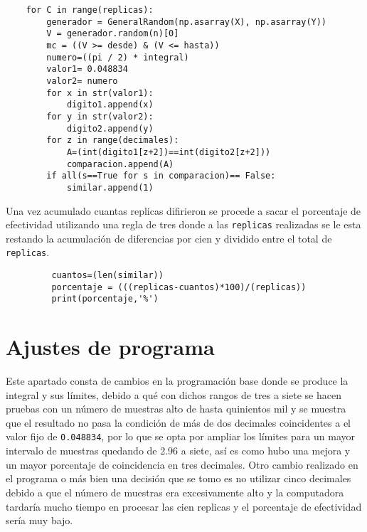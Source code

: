 \documentclass[a4paper, 11pt]{article}
\begin{document}
\begin{verbatim}
    for C in range(replicas):
        generador = GeneralRandom(np.asarray(X), np.asarray(Y))
        V = generador.random(n)[0]
        mc = ((V >= desde) & (V <= hasta))
        numero=((pi / 2) * integral)
        valor1= 0.048834
        valor2= numero
        for x in str(valor1):
            digito1.append(x)          
        for y in str(valor2):
            digito2.append(y)           
        for z in range(decimales):
            A=(int(digito1[z+2])==int(digito2[z+2]))
            comparacion.append(A)    
        if all(s==True for s in comparacion)== False:
            similar.append(1)
\end{verbatim}

\bigskip

Una vez acumulado cuantas replicas difirieron se procede a sacar el porcentaje de efectividad utilizando una regla de tres donde a las \texttt{replicas} realizadas se le esta restando la acumulación de diferencias por cien y dividido entre el total de \texttt{replicas}.

 \bigskip
 
\begin{verbatim}
         cuantos=(len(similar))
         porcentaje = (((replicas-cuantos)*100)/(replicas))
         print(porcentaje,'%')
\end{verbatim}

\section{Ajustes de programa}
Este apartado consta de cambios en la programación base donde se produce la integral y sus límites, debido a qué con dichos rangos de tres a siete se hacen pruebas con un número de muestras alto de hasta quinientos mil y se muestra que el resultado no pasa la condición de más de dos decimales coincidentes a el valor fijo de \texttt{0.048834}, por lo que se opta por ampliar los límites para un mayor intervalo de muestras quedando de 2.96 a siete, así es como hubo una mejora y un mayor porcentaje de coincidencia en tres decimales. 
Otro cambio realizado en el programa o más bien una decisión que se tomo es no utilizar cinco decimales debido a que el número de muestras era excesivamente alto y la computadora tardaría mucho tiempo en procesar las cien replicas y el porcentaje de efectividad sería muy bajo.
\end{document}
